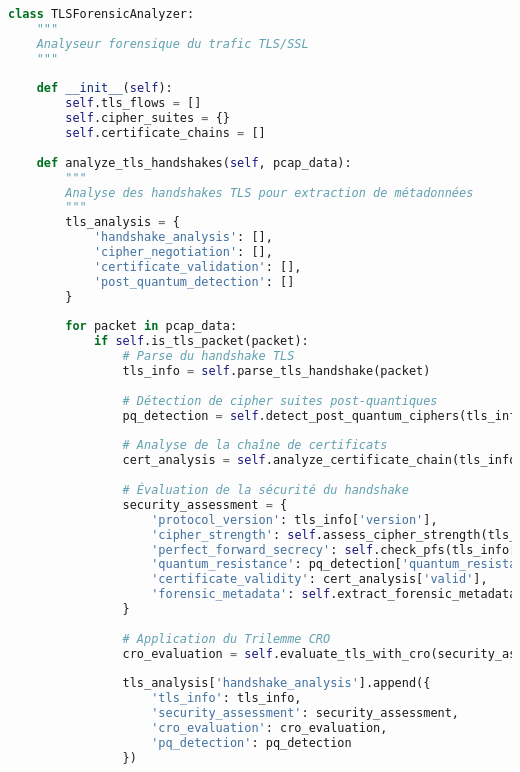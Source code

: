 \begin{lstlisting}[language=Python, caption=Analyseur de trafic TLS avec détection post-quantique]
class TLSForensicAnalyzer:
    """
    Analyseur forensique du trafic TLS/SSL
    """
    
    def __init__(self):
        self.tls_flows = []
        self.cipher_suites = {}
        self.certificate_chains = []
        
    def analyze_tls_handshakes(self, pcap_data):
        """
        Analyse des handshakes TLS pour extraction de métadonnées
        """
        tls_analysis = {
            'handshake_analysis': [],
            'cipher_negotiation': [],
            'certificate_validation': [],
            'post_quantum_detection': []
        }
        
        for packet in pcap_data:
            if self.is_tls_packet(packet):
                # Parse du handshake TLS
                tls_info = self.parse_tls_handshake(packet)
                
                # Détection de cipher suites post-quantiques
                pq_detection = self.detect_post_quantum_ciphers(tls_info)
                
                # Analyse de la chaîne de certificats
                cert_analysis = self.analyze_certificate_chain(tls_info['certificates'])
                
                # Évaluation de la sécurité du handshake
                security_assessment = {
                    'protocol_version': tls_info['version'],
                    'cipher_strength': self.assess_cipher_strength(tls_info['cipher_suite']),
                    'perfect_forward_secrecy': self.check_pfs(tls_info['key_exchange']),
                    'quantum_resistance': pq_detection['quantum_resistant'],
                    'certificate_validity': cert_analysis['valid'],
                    'forensic_metadata': self.extract_forensic_metadata(tls_info)
                }
                
                # Application du Trilemme CRO
                cro_evaluation = self.evaluate_tls_with_cro(security_assessment)
                
                tls_analysis['handshake_analysis'].append({
                    'tls_info': tls_info,
                    'security_assessment': security_assessment,
                    'cro_evaluation': cro_evaluation,
                    'pq_detection': pq_detection
                })
                

\end{lstlisting}
